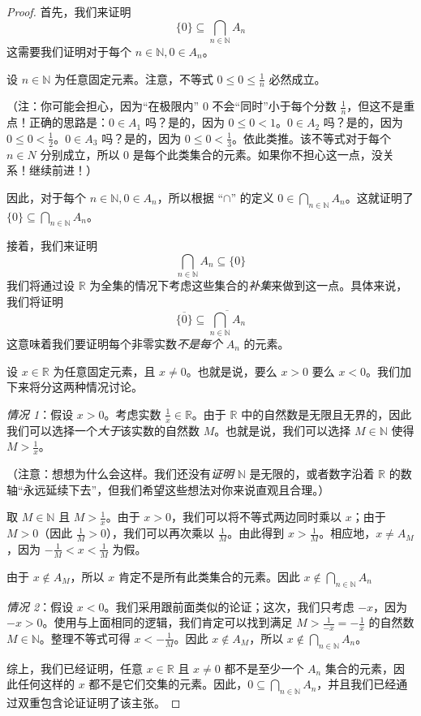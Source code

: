 \begin{proof}
    首先，我们来证明
    \[\{0\} \subseteq \bigcap_{n \in \mathbb{N}}A_n\]
    这需要我们证明对于每个 $n \in \mathbb{N}, 0 \in A_n$。

    设 $n \in \mathbb{N}$ 为任意固定元素。注意，不等式 $0 \le 0 \le \frac{1}{n}$ 必然成立。

    （注：你可能会担心，因为``在极限内'' $0$ 不会``同时''小于每个分数 $\frac{1}{n}$，但这不是重点！正确的思路是：$0 \in A_1$ 吗？是的，因为 $0 \le 0 < 1$。$0 \in A_2$ 吗？是的，因为 $0 \le 0 < \frac{1}{2}$。$0 \in A_3$ 吗？是的，因为 $0 \le 0 < \frac{1}{3}$。依此类推。该不等式对于每个 $n \in N$ 分别成立，所以 $0$ 是每个此类集合的元素。如果你不担心这一点，没关系！继续前进！）

    因此，对于每个 $n \in \mathbb{N}, 0 \in A_n$，所以根据 ``$\cap$'' 的定义 $\displaystyle{0 \in \bigcap_{n \in \mathbb{N}} A_n}$。这就证明了 $\displaystyle{\{0\} \subseteq \bigcap_{n \in \mathbb{N}} A_n}$。

    接着，我们来证明
    \[\bigcap_{n \in \mathbb{N}}A_n \subseteq \{0\}\]
    我们将通过设 $\mathbb{R}$ 为全集的情况下考虑这些集合的\emph{补集}来做到这一点。具体来说，我们将证明
    \[\overline{\{0\}} \subseteq \overline{\bigcap_{n \in \mathbb{N}}A_n}\]
    这意味着我们要证明每个非零实数\emph{不是每个} $A_n$ 的元素。

    设 $x \in \mathbb{R}$ 为任意固定元素，且 $x \ne 0$。也就是说，要么 $x > 0$ 要么 $x < 0$。我们加下来将分这两种情况讨论。

    \emph{情况 1}：假设 $x > 0$。考虑实数 $\frac{1}{x} \in \mathbb{R}$。由于 $\mathbb{R}$ 中的自然数是无限且无界的，因此我们可以选择一个\emph{大于}该实数的自然数 $M$。也就是说，我们可以选择 $M \in \mathbb{N}$ 使得 $M > \frac{1}{x}$。

    （注意：想想为什么会这样。我们还没有\emph{证明} $\mathbb{N}$ 是无限的，或者数字沿着 $\mathbb{R}$ 的数轴``永远延续下去''，但我们希望这些想法对你来说直观且合理。）

    取 $M \in \mathbb{N}$ 且 $M > \frac{1}{x}$。由于 $x > 0$，我们可以将不等式两边同时乘以 $x$；由于 $M > 0$（因此 $\frac{1}{M} > 0$），我们可以再次乘以 $\frac{1}{M}$。由此得到 $x > \frac{1}{M}$。相应地，$x \ne A_M$，因为 $-\frac{1}{M} < x < \frac{1}{M}$ 为假。

    由于 $x \notin A_M$，所以 $x$ 肯定不是所有此类集合的元素。因此 $\displaystyle{x \notin \bigcap_{n \in \mathbb{N}} A_n}$

    \emph{情况 2}：假设 $x < 0$。我们采用跟前面类似的论证；这次，我们只考虑 $-x$，因为 $-x > 0$。使用与上面相同的逻辑，我们肯定可以找到满足 $M > \frac{1}{-x} = -\frac{1}{x}$ 的自然数 $M \in \mathbb{N}$。整理不等式可得 $x < -\frac{1}{M}$。因此 $x \notin A_M$，所以 $\displaystyle{x \notin \bigcap_{n \in \mathbb{N}} A_n}$。

    综上，我们已经证明，任意 $x \in \mathbb{R}$ 且 $x \ne 0$ 都不是至少一个 $A_n$ 集合的元素，因此任何这样的 $x$ 都不是它们交集的元素。因此，$\displaystyle{{0} \subseteq \bigcap_{n \in \mathbb{N}} A_n}$，并且我们已经通过双重包含论证证明了该主张。
\end{proof}

